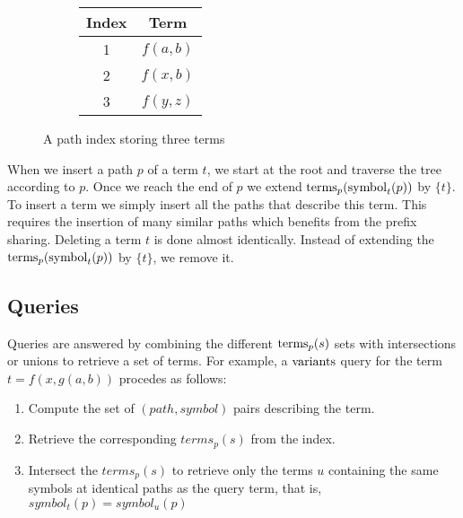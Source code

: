 \begin{figure}[h]
  \begin{subfigure}{0.66\textwidth}
  \end{subfigure}
  \begin{subfigure}{0.33\textwidth}
    \begin{tabular} { c|c }
      Index & Term\\
      \hline
      1 & $f(a,b)$\\
      2 & $f(x,b)$\\
      3 & $f(y,z)$
    \end{tabular}
  \end{subfigure}
  \caption{A path index storing three terms} \label{pathindex}
\end{figure}

When we insert a path $p$ of a term $t$, we start at the root and traverse the tree according to $p$. Once we reach the end of $p$ we extend $\mathrm{terms}_{p} (\mathrm{symbol}_{t} (p))$ by $\{t\}$. To insert a term we simply insert all the paths that describe this term. This requires the insertion of many similar paths which benefits from the prefix sharing. Deleting a term $t$ is done almost identically. Instead of extending the $\mathrm{terms}_{p} (\mathrm{symbol}_{t} (p))$ by $\{t\}$, we remove it.

\subsection{Queries}
Queries are answered by combining the different $\mathrm{terms}_{p}(s)$ sets with intersections or unions to retrieve a set of terms. For example, a $\mathrm{variants}$ query for the term $t = f(x,g(a,b))$
procedes as follows:

\begin{enumerate}
  \item Compute the set of $(path, symbol)$ pairs describing the term.
  \item Retrieve the corresponding $terms_{p}(s)$ from the index.
  \item Intersect the $terms_{p}(s)$ to retrieve only the terms $u$ containing the same symbols at identical paths as the query term, that is, $symbol_{t}(p) = symbol_{u}(p)$
\end{enumerate}

